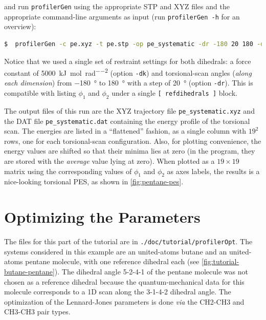 \documentclass[10pt,a4paper,openany]{memoir}
\numberwithin{equation}{section}
\newcommand{\profilergen}[0]{\texttt{profilerGen}}
\begin{document}
\noindent
and run \profilergen{} using the appropriate STP and XYZ files and the
appropriate command-line arguments as input (run \texttt{profilerGen
  -h} for an overview):

\begin{lstlisting}[language=bash]
$  profilerGen -c pe.xyz -t pe.stp -op pe_systematic -dr -180 20 180 -dk 5000
\end{lstlisting}\vspace{2ex}\par

\noindent
Notice that we used a single set of restraint settings for both
dihedrals: a force constant of
\SI{5000}{\kJ\per\mole\per\radian\squared} (option \texttt{-dk}) and
torsional-scan angles (\textit{along each dimension}) from
\SI{-180}{\degree} to \SI{180}{\degree} with a step of
\SI{20}{\degree} (option \texttt{-dr}).  This is compatible with
listing $\phi_1$ and
$\phi_2$ under a single \texttt{[~refdihedrals~]} block.

The output files of this run are the XYZ trajectory file
\texttt{pe\_systematic.xyz} and the DAT file \texttt{pe\_systematic.dat}
containing the energy profile of the torsional scan. The energies are listed in
a ``flattened'' fashion, as a single column with $19^2$ rows, one for each
torsional-scan configuration. Also, for plotting convenience, the energy values
are shifted so that their minima lies at zero (in the program, they are stored
with the \textit{average} value lying at zero).  When plotted as a $19\times 19$
matrix using the corresponding values of $\phi_1$ and $\phi_2$ as axes labels,
the results is a nice-looking torsional PES, as shown in
\autoref{fig:pentane-pes}.

\section{Optimizing the Parameters}
\label{sec:tutorial-profileropt}

The files for this part of the tutorial are in
\texttt{./doc/tutorial/profilerOpt}.
%
The systems considered in this example are an united-atoms butane and
an united-atoms pentane molecule, with one reference dihedral each
(see \autoref{fig:tutorial-butane-pentane}).
%
The dihedral angle 5-2-4-1 of the pentane molecule was not chosen as a
reference dihedral because the quantum-mechanical data for this
molecule corresponds to a 1D scan along the 3-1-4-2 dihedral angle.
%
The optimization of the Lennard-Jones parameters is done \textit{via}
the CH2-CH3 and CH3-CH3 pair types.
%
\end{document}
